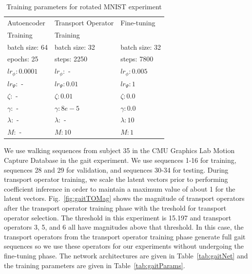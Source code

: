 \documentclass[letterpaper]{article} %
\begin{document}
\begin{table}[t]
\centering
\begin{tabular}{||l l l||}
 \hline
 Autoencoder & Transport Operator & Fine-tuning  \\
 Training & Training & \\
 \hline
 batch size: 64 & batch size: 32 & batch size: 32  \\
 epochs: 25 & steps: 2250 & steps: 7800  \\
 $lr_{\phi}: 0.0001$ & $lr_{\phi}:$ - & $lr_{\phi}: 0.005$ \\
 $lr_{\Psi}:$ - & $lr_{\Psi}: 0.01$  & $lr_{\Psi}: 1$ \\
 $\zeta:$ - & $\zeta: 0.01$  & $\zeta: 0.0$ \\
 $\gamma:$ - & $\gamma: 8e-5$  & $\gamma: 0.0$ \\
 $\lambda:$ - & $\lambda:$ - & $\lambda: 10$ \\
 $M:$ - & $M: 10$ & $M: 1$ \\
 \hline
\end{tabular}
\caption{Training parameters for rotated MNIST experiment}
\label{tab:rotDigitParams}
\end{table}





We use walking sequences from subject 35 in the CMU Graphics Lab Motion Capture Database in the gait experiment. We use sequences 1-16 for training, sequences 28 and 29 for validation, and sequences 30-34 for testing. During transport operator training, we scale the latent vectors prior to performing coefficient inference in order to maintain a maximum value of about 1 for the latent vectors. Fig.~\ref{fig:gaitTOMag} shows the magnitude of transport operators after the transport operator training phase with the treshold for transport operator selection. The threshold in this experiment is 15.197 and transport operators 3, 5, and 6 all have magnitudes above that threshold. In this case, the transport operators from the transport operator training phase generate full gait sequences so we use these operators for our experiments without undergoing the fine-tuning phase. The network architectures are given in Table~\ref{tab:gaitNet} and the training parameters are given in Table~\ref{tab:gaitParams}.
\end{document}
